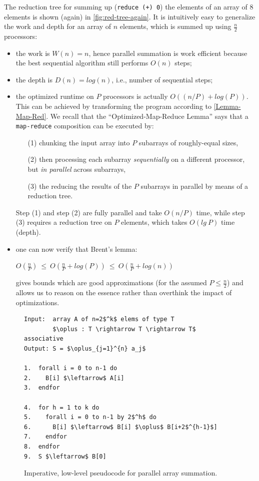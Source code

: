 \documentclass[acmsmall,review]{acmart}\settopmatter{printfolios=true,printccs=false,printacmref=false}
\begin{document}
The reduction tree for summing up (\lstinline{reduce (+) 0}) the elements 
of an array of $8$ elements is shown (again) in \cref{fig:red-tree-again}.
It is intuitively easy to generalize the work and depth for an array of
$n$ elements, which is summed up using $\frac{n}{2}$ processors:
\begin{itemize}
    \item the work is $W(n) = n$, hence parallel summation is work efficient
        because the best sequential algorithm still performs $O(n)$ steps;
    \item the depth is $D(n) = log(n)$, i.e., number of sequential steps;
    \item the optimized runtime on $P$ processors is actually 
            \emph{$O((n/P) + log(P))$.} This can be achieved by
            transforming the program according to \cref{Lemma-Map-Red}. 
            We recall that the ``Optimized-Map-Reduce Lemma'' says that
            a \lstinline{map-reduce} composition can be executed by:
        \begin{itemize}
            \item[(1)] chunking the input array into $P$ subarrays of roughly-equal 
            sizes,
            \item[(2)] then processing each subarray \emph{sequentially} on a 
            different processor, but \emph{in parallel} across subarrays,
            \item[(3)] the reducing the results of the $P$ subarrays
            in parallel by means of a reduction tree.
        \end{itemize}
            Step (1) and step (2) are fully parallel and take $O(n/P)$ time, 
            while step (3) requires 
            a reduction tree on $P$ elements, which takes $O(lg \ P)$ time (depth).
    \item one can now verify that Brent's lemma:\\
            \begin{center} $O(\frac{n}{P}) ~\leq ~O(\frac{n}{P} + log(P)) ~\leq~ O(\frac{n}{P} + log(n))$ \end{center}
          gives bounds which are good approximations (for the assumed $P \leq \frac{n}{2}$) 
            and allows us to reason on the essence rather than overthink the 
            impact of optimizations.
\end{itemize}

\begin{figure}
\begin{lstlisting}[mathescape=true]
Input:  array A of n=2$^k$ elems of type T
        $\oplus : T \rightarrow T \rightarrow T$ associative
Output: S = $\oplus_{j=1}^{n} a_j$

1.  forall i = 0 to n-1 do
2.    B[i] $\leftarrow$ A[i]
3.  endfor

4.  for h = 1 to k do
5.    forall i = 0 to n-1 by 2$^h$ do 
6.      B[i] $\leftarrow$ B[i] $\oplus$ B[i+2$^{h-1}$]
7.    endfor
8.  endfor
9.  S $\leftarrow$ B[0]  
\end{lstlisting}\vspace{-4ex}
\caption{Imperative, low-level pseudocode for parallel array summation.}
\label{fig-red-imp-pseudo}
\end{figure}
\end{document}

